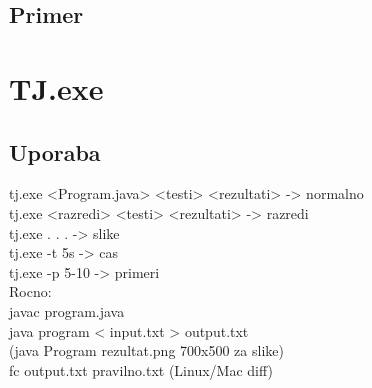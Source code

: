 \documentclass[a4paper,oneside,12pt]{article}
\theoremstyle{definition}
\begin{document}
	\subsection{Primer}
\section{TJ.exe}
	\subsection{Uporaba}
		tj.exe <Program.java> <testi> <rezultati> -> normalno\\
		tj.exe <razredi> <testi> <rezultati> -> razredi\\
		tj.exe . . . -> slike\\
		tj.exe -t 5s -> cas\\
		tj.exe -p 5-10 -> primeri\\
		Rocno:\\
		javac program.java\\
		java program < input.txt > output.txt\\
		(java Program rezultat.png 700x500 za slike)\\
		fc output.txt pravilno.txt (Linux/Mac diff)\\
\end{document}
